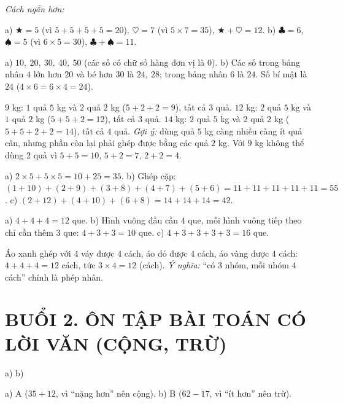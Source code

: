 \documentclass[../main.tex]{subfiles}
\begin{document}
 
\textit{Cách ngắn hơn:} 

 a) $\bigstar=5$ (vì $5+5+5+5=20$), $\heartsuit=7$ (vì $5\times7=35$), $\bigstar+\heartsuit=12$. b) $\clubsuit=6$, $\spadesuit=5$ (vì $6\times5=30$), $\clubsuit+\spadesuit=11$.

 a) $10,\ 20,\ 30,\ 40,\ 50$ (các số có chữ số hàng đơn vị là $0$). b) Các số trong bảng nhân $4$ lớn hơn $20$ và bé hơn $30$ là $24,\ 28$; trong bảng nhân $6$ là $24$. Số bí mật là $24$ ($4\times6=6\times4=24$).

 $9$ kg: $1$ quả $5$ kg và $2$ quả $2$ kg ($5+2+2=9$), tất cả $3$ quả. $12$ kg: $2$ quả $5$ kg và $1$ quả $2$ kg ($5+5+2=12$), tất cả $3$ quả. $14$ kg: $2$ quả $5$ kg và $2$ quả $2$ kg ($5+5+2+2=14$), tất cả $4$ quả. \textit{Gợi ý:} dùng quả $5$ kg càng nhiều càng ít quả cân, nhưng phần còn lại phải ghép được bằng các quả $2$ kg. Với $9$ kg không thể dùng $2$ quả vì $5+5=10$, $5+2=7$, $2+2=4$.

 a) $2\times5+5\times5=10+25=35$. b) Ghép cặp: $(1+10)+(2+9)+(3+8)+(4+7)+(5+6)=11+11+11+11+11=55$. c) $(2+12)+(4+10)+(6+8)=14+14+14=42$.

 a) $4+4+4=12$ que. b) Hình vuông đầu cần $4$ que, mỗi hình vuông tiếp theo chỉ cần thêm $3$ que: $4+3+3=10$ que. c) $4+3+3+3+3=16$ que.

 Áo xanh ghép với $4$ váy được $4$ cách, áo đỏ được $4$ cách, áo vàng được $4$ cách: $4+4+4=12$ cách, tức $3\times4=12$ (cách). \textit{Ý nghĩa:} ``có $3$ nhóm, mỗi nhóm $4$ cách'' chính là phép nhân.

\section*{BUỔI 2. ÔN TẬP BÀI TOÁN CÓ LỜI VĂN (CỘNG, TRỪ)}
 a) 
b) 

 a) A ($35+12$, vì ``nặng hơn'' nên cộng). b) B ($62-17$, vì ``ít hơn'' nên trừ).
\end{document}
